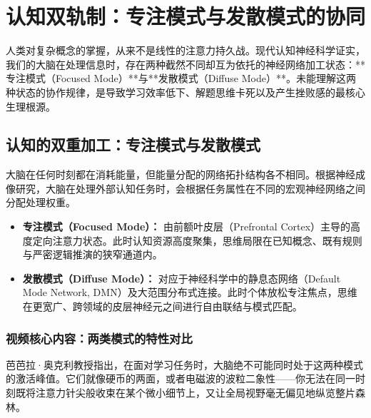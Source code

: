 \documentclass[12pt,a4paper,openany]{ctexbook}
\begin{document}
\chapter{认知双轨制：专注模式与发散模式的协同}

人类对复杂概念的掌握，从来不是线性的注意力持久战。现代认知神经科学证实，我们的大脑在处理信息时，存在两种截然不同却互为依托的神经网络加工状态：**专注模式（Focused Mode）**与**发散模式（Diffuse Mode）**。未能理解这两种状态的协作规律，是导致学习效率低下、解题思维卡死以及产生挫败感的最核心生理根源。

\section{认知的双重加工：专注模式与发散模式}

大脑在任何时刻都在消耗能量，但能量分配的网络拓扑结构各不相同。根据神经成像研究，大脑在处理外部认知任务时，会根据任务属性在不同的宏观神经网络之间分配处理权重。

\begin{keypoint}[双重加工模式的本质区别]
\begin{itemize}
    \item \textbf{专注模式（Focused Mode）：} 由前额叶皮层（Prefrontal Cortex）主导的高度定向注意力状态。此时认知资源高度聚集，思维局限在已知概念、既有规则与严密逻辑推演的狭窄通道内。
    \item \textbf{发散模式（Diffuse Mode）：} 对应于神经科学中的静息态网络（Default Mode Network, DMN）及大范围分布式连接。此时个体放松专注焦点，思维在更宽广、跨领域的皮层神经元之间进行自由联结与模式匹配。
\end{itemize}
\end{keypoint}

\subsection*{视频核心内容：两类模式的特性对比}

芭芭拉·奥克利教授指出，在面对学习任务时，大脑绝不可能同时处于这两种模式的激活峰值。它们就像硬币的两面，或者电磁波的波粒二象性——你无法在同一时刻既将注意力针尖般收束在某个微小细节上，又让全局视野毫无偏见地纵览整片森林。
\end{document}
